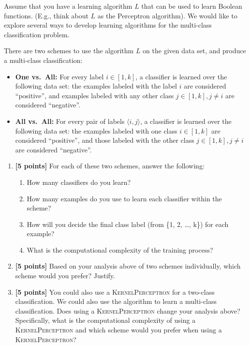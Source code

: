 \begin{enumerate}
Assume that you have a learning algorithm $L$ that can be used
to learn Boolean functions. (E.g., think about $L$ as the
Perceptron algorithm). We would like to explore several ways to
develop learning algorithms for the multi-class classification
problem.

There are two schemes to use the algorithm $L$ on the given data set, and produce a multi-class classification:
\begin{itemize}
\item {\bf One vs.~All:} For every label $i \in [1,k]$, a classifier is learned over the following data set: the examples labeled with the label $i$ are considered ``positive'', and examples labeled with any other class $j \in [1,k], j \neq i$ are considered ``negative''.
\item {\bf All vs.~All:} For every pair of labels $\langle i, j \rangle$, a classifier is learned over the following data set: the examples labeled with one class $i \in [1,k]$ are considered ``positive'', and those labeled with the other class $j \in [1,k], j \neq i$ are considered ``negative''.
\end{itemize}
%
\vspace{-3mm}
\begin{enumerate}
\item {\bf [5 points]} For each of these two schemes, answer the following:
\begin{enumerate}
\item How many classifiers do you learn?
\item How many examples do you use to learn each classifier within the scheme?
\item How will you decide the final class label (from \{1, 2, \ldots, k\}) for each example?
\item What is the computational complexity of the training process?
\end{enumerate}
\item {\bf [5 points]} Based on your analysis above of two schemes individually, which scheme would you prefer? Justify.
\item {\bf [5 points]} You could also use a \textsc{KernelPerceptron} for a two-class classification. We could also use the algorithm to learn a multi-class classification. Does using a \textsc{KernelPerceptron} change your analysis above? Specifically, what is the computational complexity of using a \textsc{KernelPerceptron} and which scheme would you prefer when using a \textsc{KernelPerceptron}? 


\end{enumerate}
\end{enumerate}
